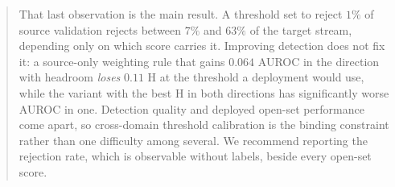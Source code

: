 \begin{abstract}
That last observation is the main result. A threshold set to reject $1\%$ of source
validation rejects between $7\%$ and $63\%$ of the target stream, depending only on which
score carries it. Improving detection does not fix it: a source-only weighting rule that
gains $0.064$ AUROC in the direction with headroom \emph{loses} $0.11$ H at the threshold a
deployment would use, while the variant with the best H in both directions has
significantly worse AUROC in one. Detection quality and deployed open-set performance come
apart, so cross-domain threshold calibration is the binding constraint rather than one
difficulty among several. We recommend reporting the rejection rate, which is observable
without labels, beside every open-set score.
\end{abstract}

